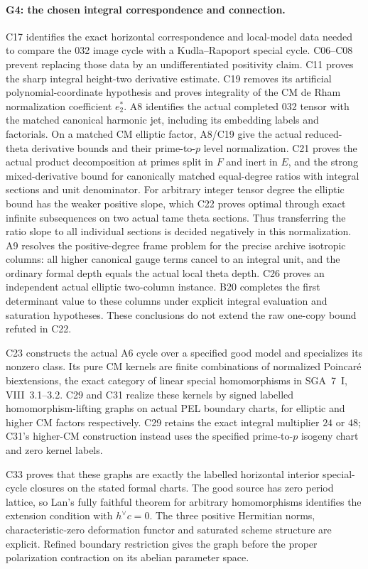 \documentclass[11pt]{article}
\theoremstyle{definition}\newtheorem{definition}[theorem]{Definition}\newtheorem{remark}[theorem]{Remark}
\begin{document}
\paragraph{G4: the chosen integral correspondence and connection.}
C17 identifies the exact horizontal correspondence and local-model
data needed to compare the 032 image cycle with a Kudla--Rapoport
special cycle. C06--C08 prevent replacing those data by an
undifferentiated positivity claim. C11 proves the sharp integral
height-two derivative estimate. C19 removes its artificial
polynomial-coordinate hypothesis and proves integrality of the
CM de Rham normalization coefficient $e_2^*$.
A8 identifies the actual completed 032 tensor with the matched
canonical harmonic jet, including its embedding labels and
factorials. On a matched CM elliptic factor, A8/C19 give the
actual reduced-theta derivative bounds and their prime-to-$p$
level normalization. C21 proves the actual product decomposition
at primes split in $F$ and inert in $E$, and the strong
mixed-derivative bound for canonically matched equal-degree
ratios with integral sections and unit denominator.
For arbitrary integer tensor degree the elliptic bound has
the weaker positive slope, which C22 proves optimal through
exact infinite subsequences on two actual tame theta sections.
Thus transferring the ratio slope to all individual sections
is decided negatively in this normalization.
A9 resolves the positive-degree frame problem for the precise
archive isotropic columns: all higher canonical gauge terms
cancel to an integral unit, and the ordinary formal depth
equals the actual local theta depth. C26 proves an independent
actual elliptic two-column instance. B20 completes the first
determinant value to these columns under explicit integral
evaluation and saturation hypotheses. These conclusions do
not extend the raw one-copy bound refuted in C22.

C23 constructs the actual A6 cycle over a specified good model
and specializes its nonzero class. Its pure CM kernels are
finite combinations of normalized Poincar\'e biextensions,
the exact category of linear special homomorphisms in SGA~7~I,
VIII~3.1--3.2. C29 and C31 realize these kernels by signed
labelled homomorphism-lifting graphs on actual PEL boundary
charts, for elliptic and higher CM factors respectively.
C29 retains the exact integral multiplier $24$ or $48$;
C31's higher-CM construction instead uses the specified
prime-to-$p$ isogeny chart and zero kernel labels.

C33 proves that these graphs are exactly the labelled horizontal
interior special-cycle closures on the stated formal charts.
The good source has zero period lattice, so Lan's fully faithful
theorem for arbitrary homomorphisms identifies the extension
condition with $h^\vee c=0$. The three positive Hermitian norms,
characteristic-zero deformation functor and saturated scheme
structure are explicit. Refined boundary restriction gives the
graph before the proper polarization contraction on its
abelian parameter space.
\end{document}
